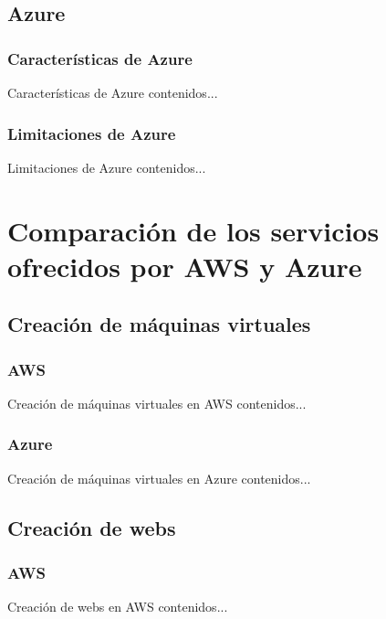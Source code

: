 \documentclass[aspectratio=1610]{beamer}
\begin{document}
\subsection{Azure}
\subsubsection{Características de Azure}
\begin{frame}{Características de Azure}
contenidos...
\end{frame}

\subsubsection{Limitaciones de Azure}
\begin{frame}{Limitaciones de Azure}
contenidos...
\end{frame}

\section{Comparación de los servicios ofrecidos por AWS y Azure}
\subsection{Creación de máquinas virtuales}
\subsubsection{AWS}
\begin{frame}{Creación de máquinas virtuales en AWS}
	contenidos...
\end{frame}

\subsubsection{Azure}
\begin{frame}{Creación de máquinas virtuales en Azure}
	contenidos...
\end{frame}

\subsection{Creación de webs}
\subsubsection{AWS}
\begin{frame}{Creación de webs en AWS}
	contenidos...
\end{frame}
\end{document}
